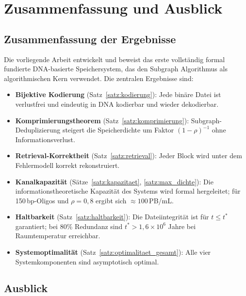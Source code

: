 ﻿\documentclass[a4paper,12pt]{article}
\theoremstyle{definition}
\begin{document}
\section{Zusammenfassung und Ausblick}
\label{sec:zusammenfassung}

\subsection{Zusammenfassung der Ergebnisse}

Die vorliegende Arbeit entwickelt und beweist das erste vollst\"{a}ndig
formal fundierte DNA-basierte Speichersystem, das den Subgraph Algorithmus
als algorithmischen Kern verwendet. Die zentralen Ergebnisse sind:

\begin{itemize}
    \item \textbf{Bijektive Kodierung} (Satz~\ref{satz:kodierung}):
          Jede bin\"{a}re Datei ist verlustfrei und eindeutig in DNA
          kodierbar und wieder dekodierbar.
    \item \textbf{Komprimierungstheorem} (Satz~\ref{satz:komprimierung}):
          Subgraph-Deduplizierung steigert die Speicherdichte um Faktor
          $(1-\rho)^{-1}$ ohne Informationsverlust.
    \item \textbf{Retrieval-Korrektheit} (Satz~\ref{satz:retrieval}):
          Jeder Block wird unter dem Fehlermodell korrekt rekonstruiert.
    \item \textbf{Kanalkapazit\"{a}t} (S\"{a}tze~\ref{satz:kapazitaet},
          \ref{satz:max_dichte}): Die informationstheoretische Kapazit\"{a}t
          des Systems wird formal hergeleitet; f\"{u}r 150\,bp-Oligos
          und $\rho = 0{,}8$ ergibt sich $\approx 100$\,PB/mL.
    \item \textbf{Haltbarkeit} (Satz~\ref{satz:haltbarkeit}):
          Die Dateiintegrit\"{a}t ist f\"{u}r $t \le t^*$ garantiert;
          bei 80\% Redundanz sind $t^* > 1{,}6 \times 10^6$ Jahre
          bei Raumtemperatur erreichbar.
    \item \textbf{Systemoptimalit\"{a}t} (Satz~\ref{satz:optimalitaet_gesamt}):
          Alle vier Systemkomponenten sind asymptotisch optimal.
\end{itemize}

\subsection{Ausblick}
\end{document}
